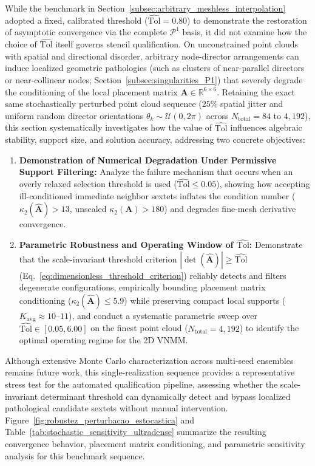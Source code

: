 \documentclass[preprint,12pt]{elsarticle}
\begin{document}
While the benchmark in Section~\ref{subsec:arbitrary_meshless_interpolation} adopted a fixed, calibrated threshold ($\widehat{\mathrm{Tol}} = 0.80$) to demonstrate the restoration of asymptotic convergence via the complete $\mathcal{P}^1$ basis, it did not examine how the choice of $\widehat{\mathrm{Tol}}$ itself governs stencil qualification. On unconstrained point clouds with spatial and directional disorder, arbitrary node-director arrangements can induce localized geometric pathologies (such as clusters of near-parallel directors or near-collinear nodes; Section~\ref{subsec:singularities_P1}) that severely degrade the conditioning of the local placement matrix $\mathbf{A} \in \mathbb{R}^{6 \times 6}$. Retaining the exact same stochastically perturbed point cloud sequence ($25\%$ spatial jitter and uniform random director orientations $\theta_k \sim \mathcal{U}(0, 2\pi)$ across $N_{\mathrm{total}} = 84$ to $4{,}192$), this section systematically investigates how the value of $\widehat{\mathrm{Tol}}$ influences algebraic stability, support size, and solution accuracy, addressing two concrete objectives:
\begin{enumerate}
    \item \textbf{Demonstration of Numerical Degradation Under Permissive Support Filtering:} Analyze the failure mechanism that occurs when an overly relaxed selection threshold is used ($\widehat{\mathrm{Tol}} \le 0.05$), showing how accepting ill-conditioned immediate neighbor sextets inflates the condition number ($\kappa_2(\widehat{\mathbf{A}}) > 13$, unscaled $\kappa_2(\mathbf{A}) > 180$) and degrades fine-mesh derivative convergence.
    \item \textbf{Parametric Robustness and Operating Window of $\widehat{\mathrm{Tol}}$:} Demonstrate that the scale-invariant threshold criterion $|\det(\widehat{\mathbf{A}})| \ge \widehat{\mathrm{Tol}}$ (Eq.~\eqref{eq:dimensionless_threshold_criterion}) reliably detects and filters degenerate configurations, empirically bounding placement matrix conditioning ($\kappa_2(\widehat{\mathbf{A}}) \le 5.9$) while preserving compact local supports ($K_{\mathrm{avg}} \approx 10\text{--}11$), and conduct a systematic parametric sweep over $\widehat{\mathrm{Tol}} \in [0.05, 6.00]$ on the finest point cloud ($N_{\mathrm{total}} = 4{,}192$) to identify the optimal operating regime for the 2D VNMM.
\end{enumerate}

Although extensive Monte Carlo characterization across multi-seed ensembles remains future work, this single-realization sequence provides a representative stress test for the automated qualification pipeline, assessing whether the scale-invariant determinant threshold can dynamically detect and bypass localized pathological candidate sextets without manual intervention. Figure~\ref{fig:robustez_perturbacao_estocastica} and Table~\ref{tab:stochastic_sensitivity_ultradense} summarize the resulting convergence behavior, placement matrix conditioning, and parametric sensitivity analysis for this benchmark sequence.
\end{document}
